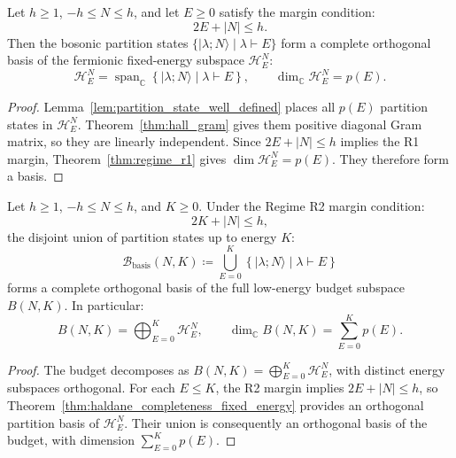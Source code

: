 \begin{theorem}
\label{thm:haldane_completeness_fixed_energy}
Let $h \ge 1$, $-h \le N \le h$, and let $E \ge 0$ satisfy the margin condition:
\begin{equation}
2E + |N| \le h.
\end{equation}
Then the bosonic partition states $\{|\lambda; N\rangle \mid \lambda \vdash E\}$ form a complete orthogonal basis of the fermionic fixed-energy subspace $\mathcal{H}^N_E$:
\begin{equation}
\mathcal{H}^N_E = \operatorname{span}_{\mathbb{C}} \left\{ |\lambda; N\rangle \mid \lambda \vdash E \right\}, \qquad \dim_{\mathbb{C}} \mathcal{H}^N_E = p(E).
\end{equation}
\end{theorem}

\begin{proof}
Lemma~\ref{lem:partition_state_well_defined} places all $p(E)$ partition
states in $\mathcal{H}^N_E$. Theorem~\ref{thm:hall_gram} gives them
positive diagonal Gram matrix, so they are linearly independent. Since
$2E+|N|\le h$ implies the R1 margin, Theorem~\ref{thm:regime_r1}
gives $\dim\mathcal{H}^N_E=p(E)$. They therefore form a basis.
\end{proof}

\begin{theorem}
\label{thm:whole_budget_basis}
Let $h \ge 1$, $-h \le N \le h$, and $K \ge 0$. Under the Regime R2 margin condition:
\begin{equation}
2K + |N| \le h,
\end{equation}
the disjoint union of partition states up to energy $K$:
\begin{equation}
\mathcal{B}_{\mathrm{basis}}(N, K) \coloneqq \bigcup_{E=0}^K \left\{ |\lambda; N\rangle \mid \lambda \vdash E \right\}
\end{equation}
forms a complete orthogonal basis of the full low-energy budget subspace $B(N, K)$.
In particular:
\begin{equation}
B(N, K) = \bigoplus_{E=0}^K \mathcal{H}^N_E, \qquad \dim_{\mathbb{C}} B(N, K) = \sum_{E=0}^K p(E).
\end{equation}
\end{theorem}

\begin{proof}
The budget decomposes as $B(N,K)=\bigoplus_{E=0}^K\mathcal{H}^N_E$,
with distinct energy subspaces orthogonal. For each $E\le K$, the R2
margin implies $2E+|N|\le h$, so Theorem~\ref{thm:haldane_completeness_fixed_energy}
provides an orthogonal partition basis of $\mathcal{H}^N_E$. Their union
is consequently an orthogonal basis of the budget, with dimension
$\sum_{E=0}^Kp(E)$.
\end{proof}

